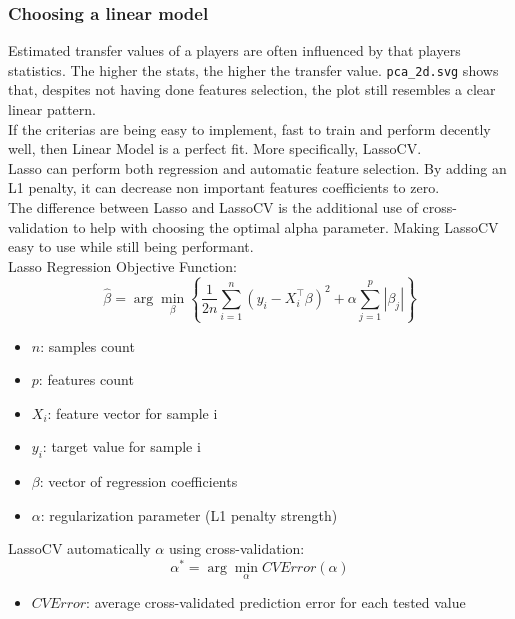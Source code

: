 \documentclass{report}
\begin{document}
\subsubsection{Choosing a linear model}
Estimated transfer values of a players are often influenced by that players statistics. The higher
the stats, the higher the transfer value. \verb|pca_2d.svg| shows that, despites not having done
features selection, the plot still resembles a clear linear pattern. \\

\noindent If the criterias are being easy to implement, fast to train and perform decently well, then 
Linear Model is a perfect fit. More specifically, LassoCV. \\

\noindent Lasso can perform both regression and automatic feature selection. By adding an L1 penalty, 
it can decrease non important features coefficients to zero. \\

\noindent The difference between Lasso and LassoCV is the additional use of cross-validation to help with 
choosing the optimal alpha parameter. Making LassoCV easy to use while still being performant. \\

\noindent Lasso Regression Objective Function:
\[  %
    \hat{\beta} = \arg\min_{\beta} \left\{ \frac{1}{2n} \sum_{i=1}^{n} 
    (y_i - X_i^{\top} \beta)^2 + \alpha \sum_{j=1}^{p} |\beta_j| \right\}
\]
\begin{itemize}
    \item \( n \): samples count
    \item \( p \): features count
    \item \( X_i \): feature vector for sample i
    \item \( y_i \): target value for sample i
    \item \( \beta \): vector of regression coefficients
    \item \( \alpha \): regularization parameter (L1 penalty strength)
\end{itemize}

LassoCV automatically $\alpha$ using cross-validation:
\[ \alpha^* = \arg\min_{\alpha} CVError(\alpha) \]
\begin{itemize}
    \item \( CVError \): average cross-validated prediction error for each tested value
\end{itemize}
\end{document}
